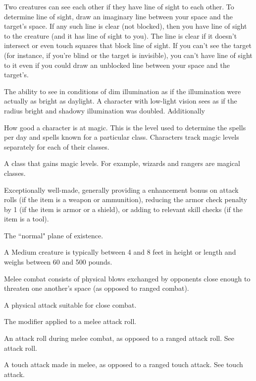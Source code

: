  Two creatures can see each other if they have line 
of sight to each other. To determine line of sight, draw an imaginary 
line between your space and the target's space. If any such line is 
clear (not blocked), then you have line of sight to the creature (and it 
has line of sight to you). The line is clear if it doesn't intersect or 
even touch squares that block line of sight. If you can't see the target 
(for instance, if you're blind or the target is invisible), you can't have 
line of sight to it even if you could draw an unblocked line between 
your space and the target's. 

 The ability to see in conditions of dim illumination as if the illumination were actually as bright as daylight. A character with low-light vision sees as if the radius bright and shadowy illumination was doubled. Additionally 


 How good a character is at magic. This is the level used to determine the spells per day and spells known for a particular class. Characters track magic levels separately for each of their classes.

 A class that gains magic levels. For example, wizards and rangers are magical classes.


 Exceptionally well-made, generally providing a  
enhancement bonus on attack rolls (if the item is a weapon or 
ammunition), reducing the armor check penalty by 1 (if the item is 
armor or a shield), or adding  to relevant skill checks (if the item is 
a tool). 

 The ``normal" plane of existence. 

 A Medium creature is typically between 4 and 8 feet in 
height or length and weighs between 60 and 500 pounds. 

 Melee combat consists of physical blows exchanged by 
opponents close enough to threaten one another's space (as opposed 
to ranged combat). 

 A physical attack suitable for close combat. 

 The modifier applied to a melee attack roll. 

 An attack roll during melee combat, as 
opposed to a ranged attack roll. See attack roll. 

 A touch attack made in melee, as opposed to 
a ranged touch attack. See touch attack. 

